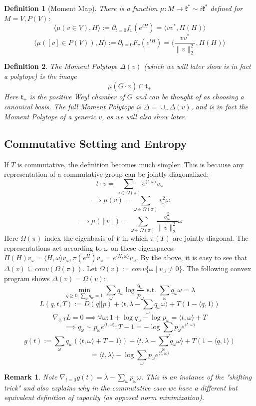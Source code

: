 \documentclass{article}
\newtheorem{remark}{Remark}
\newtheorem{definition}{Definition}
\begin{document}
\begin{definition} [Moment Map]
There is a function $\mu : M \to \mathfrak{k}^{*} \sim i \mathfrak{k}^{*}$ defined for $M = V,P(V)$:
\[ \langle \mu(v \in V), H \rangle := \partial_{t=0} f_{v}(e^{tH}) = \langle v v^{*}, \Pi(H) \rangle   \]
\[ \langle \mu([v] \in P(V)), H \rangle := \partial_{t=0} F_{v}(e^{tH}) = \langle \frac{v v^{*}}{\|v\|_{2}^{2}}, \Pi(H) \rangle  \]
\end{definition}

\begin{definition}
The Moment Polytope $\Delta(v)$ (which we will later show is in fact a polytope) is the image
\[ \mu(\overline{G \cdot v}) \cap \mathfrak{t}_{+}   \]
Here $\mathfrak{t}_{+}$ is the positive Weyl chamber of $G$ and can be thought of as choosing a canonical basis. The full Moment Polytope is $\Delta = \cup_{v} \Delta(v)$, and is in fact the Moment Polytope of a generic $v$, as we will also show later. 
\end{definition}

\subsection{Commutative Setting and Entropy}
If $T$ is commutative, the definition becomes much simpler. This is because any representation of a commutative group can be jointly diagonalized:
\[ t \cdot v = \sum_{\omega \in \Omega(\pi)} e^{\langle t, \omega \rangle} v_{\omega}   \]
\[ \implies \mu(v) = \sum_{\omega \in \Omega(\pi)} v_{\omega}^{2} \omega    \]
\[ \implies \mu([v]) = \sum_{\omega \in \Omega(\pi)} \frac{v_{\omega}^{2}}{\|v\|_{2}^{2}} \omega  \]
Here $\Omega(\pi)$ index the eigenbasis of $V$ in which $\pi(T)$ are jointly diagonal. The representations act according to $\omega$ on these eigenspaces: $\Pi(H)v_{\omega} = \langle H, \omega \rangle v_{\omega}, \pi(e^{H})v_{\omega} = e^{\langle H, \omega \rangle} v_{\omega}$. 
By the above, it is easy to see that $\Delta(v) \subseteq conv(\Omega(\pi))$. Let $\Omega(v) := conv\{\omega \mid v_{\omega} \neq 0\}$. The following convex program shows $\Delta(v) = \Omega(v)$:
\[ \min_{q \geq 0, \sum_{\omega} q_{w} = 1} \sum_{\omega} q_{\omega} \log \frac{q_{\omega}}{p_{\omega}} \text{ s.t. } \sum_{\omega} q_{\omega} \omega = \lambda  \]
\[ L(q,t,T) := D(q||p) + \langle t, \lambda - \sum_{\omega} q_{\omega} \omega \rangle + T (1 - \langle q, 1 \rangle)    \]
\[ \nabla_{q,T} L = 0 \implies \forall \omega: 1 + \log q_{\omega} - \log p_{\omega} = \langle t, \omega \rangle + T  \]
\[ \implies q_{\omega} \sim p_{\omega} e^{\langle t, \omega \rangle}; T - 1 = -\log \sum_{\omega} p_{\omega} e^{\langle t, \omega \rangle}  \]
\[ g(t) := \sum_{\omega} q_{w} (\langle t, \omega \rangle + T - 1 \rangle) + \langle t, \lambda - \sum_{\omega} q_{\omega} \omega \rangle + T(1 - \langle q, 1 \rangle)  \]
\[ = \langle t, \lambda \rangle - \log \sum_{\omega} p_{\omega} e^{\langle t, \omega \rangle}    \]
\begin{remark}
Note $\nabla_{t=0} g(t) = \lambda - \sum_{\omega} p_{\omega} \omega$. This is an instance of the "shifting trick" and also explains why in the commutative case we have a different but equivalent definition of capacity (as opposed norm minimization). 
\end{remark}
\end{document}
